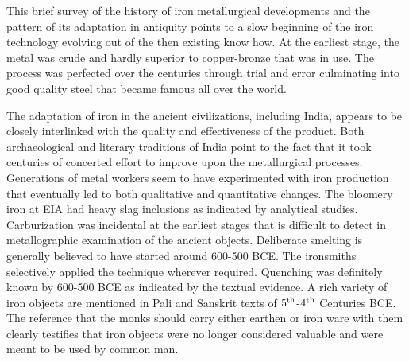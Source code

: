 This brief survey of the history of iron metallurgical developments and the pattern of its adaptation in antiquity points to a slow beginning of the iron technology evolving out of the then existing know how. At the earliest stage, the metal was crude and hardly superior to copper-bronze that was in use. The process was perfected over the centuries through trial and error culminating into good quality steel that became famous all over the world. 

The adaptation of iron in the ancient civilizations, including India, appears to be closely interlinked with the quality and effectiveness of the product. Both archaeological and literary traditions of India point to the fact that it took centuries of concerted effort to improve upon the metallurgical processes. Generations of metal workers seem to have experimented with iron production that eventually led to both qualitative and quantitative changes. The bloomery iron at EIA had heavy slag inclusions as indicated by analytical studies. Carburization was incidental at the earliest stages that is difficult to detect in metallographic examination of the ancient objects. Deliberate smelting is generally believed to have started around 600-500 BCE.  The ironsmiths selectively applied the technique wherever required. Quenching was definitely known by 600-500 BCE as indicated by the textual evidence. A rich variety of iron objects are mentioned   in Pali and Sanskrit texts of $5^{\rm th}$-$4^{\rm th}$ Centuries BCE. The reference that the monks should carry either earthen or iron ware with them clearly testifies that iron objects were no longer considered valuable and were meant to be used by common man.

